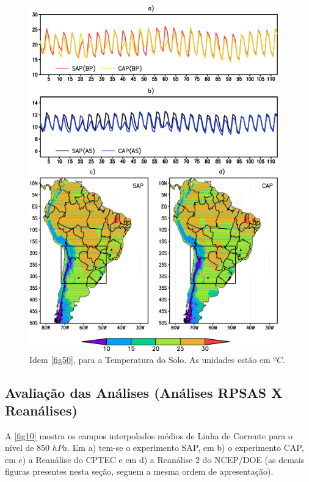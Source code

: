 \begin{figure}[!hbp]
\centering
\includegraphics[height=15cm]{./figs/serie_temperatura_solo-ANL-new.png}
\caption{Idem \autoref{fig50}, para a Temperatura do Solo. As unidades estão em $ºC$.}
\label{fig51}
\end{figure}

\break

\subsection{Avaliação das Análises (Análises RPSAS X Reanálises)}
\label{ss:avalanl}

A \autoref{fig10} mostra os campos interpolados médios de Linha de Corrente para o nível de 850 $hPa$. Em a) tem-se o experimento SAP, em b) o experimento CAP, em c) a Reanálise do CPTEC e em d) a Reanálise 2 do NCEP/DOE (as demais figuras presentes nesta seção, seguem a mesma ordem de apresentação).

